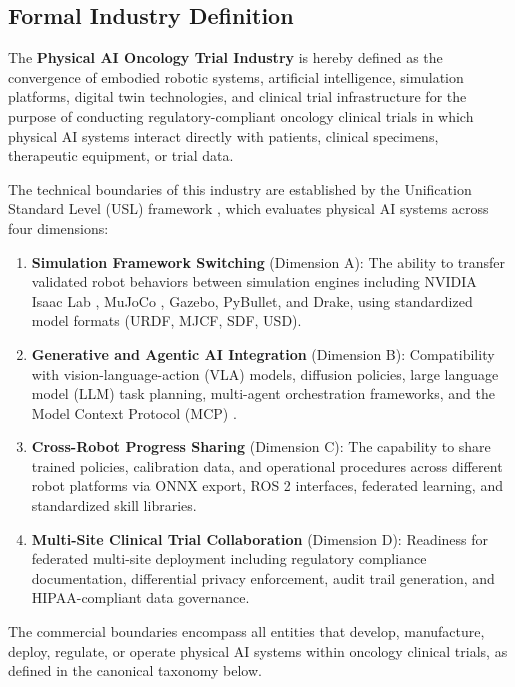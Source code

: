 \documentclass[11pt,letterpaper]{article}
\begin{document}
\subsection{Formal Industry Definition}

The \textbf{Physical AI Oncology Trial Industry} is hereby defined as the convergence of embodied robotic systems, artificial intelligence, simulation platforms, digital twin technologies, and clinical trial infrastructure for the purpose of conducting regulatory-compliant oncology clinical trials in which physical AI systems interact directly with patients, clinical specimens, therapeutic equipment, or trial data.

The technical boundaries of this industry are established by the Unification Standard Level (USL) framework \cite{kawchak2026usl}, which evaluates physical AI systems across four dimensions:

\begin{enumerate}
  \item \textbf{Simulation Framework Switching} (Dimension A): The ability to transfer validated robot behaviors between simulation engines including NVIDIA Isaac Lab \cite{isaaclab2024}, MuJoCo \cite{mujoco2024}, Gazebo, PyBullet, and Drake, using standardized model formats (URDF, MJCF, SDF, USD).
  \item \textbf{Generative and Agentic AI Integration} (Dimension B): Compatibility with vision-language-action (VLA) models, diffusion policies, large language model (LLM) task planning, multi-agent orchestration frameworks, and the Model Context Protocol (MCP) \cite{mcp2025}.
  \item \textbf{Cross-Robot Progress Sharing} (Dimension C): The capability to share trained policies, calibration data, and operational procedures across different robot platforms via ONNX export, ROS 2 interfaces, federated learning, and standardized skill libraries.
  \item \textbf{Multi-Site Clinical Trial Collaboration} (Dimension D): Readiness for federated multi-site deployment including regulatory compliance documentation, differential privacy enforcement, audit trail generation, and HIPAA-compliant data governance.
\end{enumerate}

The commercial boundaries encompass all entities that develop, manufacture, deploy, regulate, or operate physical AI systems within oncology clinical trials, as defined in the canonical taxonomy below.
\end{document}
